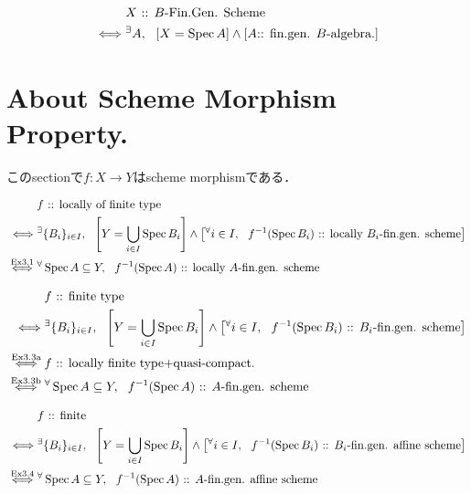 \documentclass[a4paper]{jsarticle}
\begin{document}
\begin{Def}
\begin{align*}
    {}&     X\text{ :: $B$-Fin.Gen. Scheme} \\
    \iff&  
            {}^{\exists} A,~~
            \left[X=\operatorname{Spec} A\right] \land \left[A\text{:: fin.gen. $B$-algebra.}\right]
\end{align*}
\end{Def}

\section{About Scheme Morphism Property.}
このsectionで$f: X \to Y$はscheme morphismである．

\begin{Def}
\begin{align*}
    {}&     f\text{ :: locally of finite type} \\
    \iff&
            {}^{\exists} \{B_i\}_{i \in I},~~
            \left[Y=\bigcup_{i \in I} \operatorname{Spec} B_i\right] \land \left[{}^{\forall} i \in I,~~ f^{-1}(\operatorname{Spec} B_i)\text{ :: locally $B_i$-fin.gen. scheme}\right] \\
    \overset{\text{ Ex3.1 }}{\iff}&
            {}^{\forall} \operatorname{Spec} A \subseteq Y,~~ f^{-1}(\operatorname{Spec} A)\text{ :: locally $A$-fin.gen. scheme}
\end{align*}
\end{Def}

\begin{Def}
\begin{align*}
    {}&     f\text{ :: finite type} \\
    \iff&
            {}^{\exists} \{B_i\}_{i \in I},~~
            \left[Y=\bigcup_{i \in I} \operatorname{Spec} B_i\right] \land \left[{}^{\forall} i \in I,~~ f^{-1}(\operatorname{Spec} B_i)\text{ :: $B_i$-fin.gen. scheme}\right] \\
    \overset{\text{ Ex3.3a }}{\iff}&
            f\text{ :: locally finite type+quasi-compact.} \\
    \overset{\text{ Ex3.3b }}{\iff}&
            {}^{\forall} \operatorname{Spec} A \subseteq Y,~~ f^{-1}(\operatorname{Spec} A)\text{ :: $A$-fin.gen. scheme}
\end{align*}
\end{Def}

\begin{Def}[Finite]
\begin{align*}
    {}&     f\text{ :: finite} \\
    \iff&
            {}^{\exists} \{B_i\}_{i \in I},~~
            \left[Y=\bigcup_{i \in I} \operatorname{Spec} B_i\right] \land \left[{}^{\forall} i \in I,~~ f^{-1}(\operatorname{Spec} B_i)\text{ :: $B_i$-fin.gen. affine scheme}\right] \\
    \overset{\text{ Ex3.4 }}{\iff}&
            {}^{\forall} \operatorname{Spec} A \subseteq Y,~~ f^{-1}(\operatorname{Spec} A)\text{ :: $A$-fin.gen. affine scheme} \\
\end{align*}
\end{Def}
\end{document}
